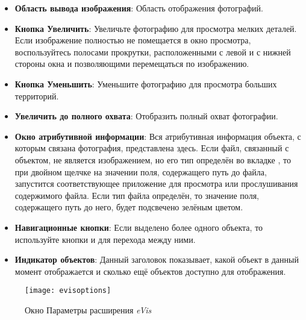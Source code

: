 \begin{itemize}[label=--]
\item \textbf{Область вывода изображения}: Область отображения фотографий.
\item \textbf{Кнопка Увеличить}: Увеличьте фотографию для просмотра мелких
деталей. Если изображение полностью не помещается в окно просмотра,
воспользуйтесь полосами прокрутки, расположенными с левой и с нижней
стороны окна и позволяющими перемещаться по изображению.
\item \textbf{Кнопка Уменьшить}: Уменьшите фотографию для просмотра больших
территорий.
\item \textbf{Увеличить до полного охвата}: Отобразить полный охват
фотографии.
\item \textbf{Окно атрибутивной информации}: Вся атрибутивная информация
объекта, с которым связана фотография, представлена здесь. Если
файл, связанный с объектом, не является изображением, но его тип определён во
вкладке , то при двойном щелчке на значении поля,
содержащего путь до файла, запустится соответствующее приложение
для просмотра или прослушивания содержимого файла. Если тип файла определён,
то значение поля, содержащего путь до него, будет подсвечено зелёным цветом.
\item \textbf{Навигационные кнопки}: Если выделено более одного
объекта, то используйте кнопки  и 
для перехода между ними.
\item \textbf{Индикатор объектов}: Данный заголовок показывает, какой объект
в данный момент отображается и сколько ещё объектов доступно для отображения.
\end{itemize}

\label{evis_options_window}

\begin{figure}[ht]
   \centering
   \texttt{[image: evisoptions]}
   \caption{\label{evisoptions}Окно Параметры расширения \emph{eVis} \wincaption}
\end{figure}

